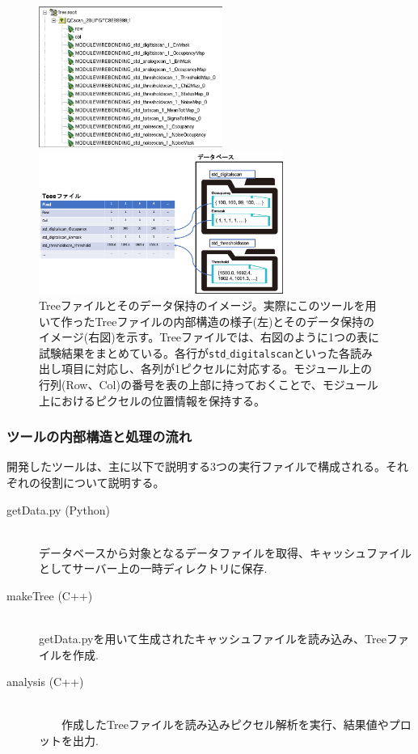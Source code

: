 \begin{figure}[bpt]
  \begin{minipage}{0.4\hsize}
    \begin{center}
    \includegraphics[width=6cm]{./analysis_tool_tree_file.png}
    \end{center}
  \end{minipage}
  \begin{minipage}{0.4\hsize}
    \begin{center}
    \includegraphics[width=8cm]{./analysis_tool_tree_image.png}
    \end{center}
  \end{minipage}
  \caption[Treeファイルとそのデータ保持のイメージ]{Treeファイルとそのデータ保持のイメージ。実際にこのツールを用いて作ったTreeファイルの内部構造の様子(左)とそのデータ保持のイメージ(右図)を示す。Treeファイルでは、右図のように1つの表に試験結果をまとめている。各行が\texttt{std$\_$digitalscan}といった各読み出し項目に対応し、各列が1ピクセルに対応する。モジュール上の行列(Row、Col)の番号を表の上部に持っておくことで、モジュール上におけるピクセルの位置情報を保持する。}
  \label{analysis_tool_tree}
\end{figure}

\subsubsection{ツールの内部構造と処理の流れ}
開発したツールは、主に以下で説明する3つの実行ファイルで構成される。それぞれの役割について説明する。

\begin{description}
  \item[getData.py (Python)]\mbox{}\\ 
    データベースから対象となるデータファイルを取得、キャッシュファイルとしてサーバー上の一時ディレクトリに保存.
  \item[makeTree (C++)]\mbox{}\\ 
    getData.pyを用いて生成されたキャッシュファイルを読み込み、Treeファイルを作成.
  \item[analysis (C++)]\mbox{}\\ 
　　作成したTreeファイルを読み込みピクセル解析を実行、結果値やプロットを出力.
\end{description}

